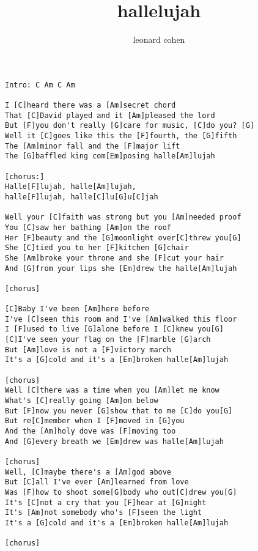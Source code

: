 \author{leonard cohen}
\title{hallelujah}
\maketitle
\begin{verbatim}
Intro: C Am C Am

I [C]heard there was a [Am]secret chord
That [C]David played and it [Am]pleased the lord
But [F]you don't really [G]care for music, [C]do you? [G]
Well it [C]goes like this the [F]fourth, the [G]fifth
The [Am]minor fall and the [F]major lift
The [G]baffled king com[Em]posing halle[Am]lujah

[chorus:]
Halle[F]lujah, halle[Am]lujah,
halle[F]lujah, halle[C]lu[G]u[C]jah

Well your [C]faith was strong but you [Am]needed proof
You [C]saw her bathing [Am]on the roof
Her [F]beauty and the [G]moonlight over[C]threw you[G]
She [C]tied you to her [F]kitchen [G]chair
She [Am]broke your throne and she [F]cut your hair
And [G]from your lips she [Em]drew the halle[Am]lujah

[chorus]

[C]Baby I've been [Am]here before
I've [C]seen this room and I've [Am]walked this floor
I [F]used to live [G]alone before I [C]knew you[G]
[C]I've seen your flag on the [F]marble [G]arch
But [Am]love is not a [F]victory march
It's a [G]cold and it's a [Em]broken halle[Am]lujah

[chorus]
Well [C]there was a time when you [Am]let me know
What's [C]really going [Am]on below
But [F]now you never [G]show that to me [C]do you[G]
But re[C]member when I [F]moved in [G]you
And the [Am]holy dove was [F]moving too
And [G]every breath we [Em]drew was halle[Am]lujah

[chorus]
Well, [C]maybe there's a [Am]god above
But [C]all I've ever [Am]learned from love
Was [F]how to shoot some[G]body who out[C]drew you[G]
It's [C]not a cry that you [F]hear at [G]night
It's [Am]not somebody who's [F]seen the light
It's a [G]cold and it's a [Em]broken halle[Am]lujah

[chorus]
\end{verbatim}